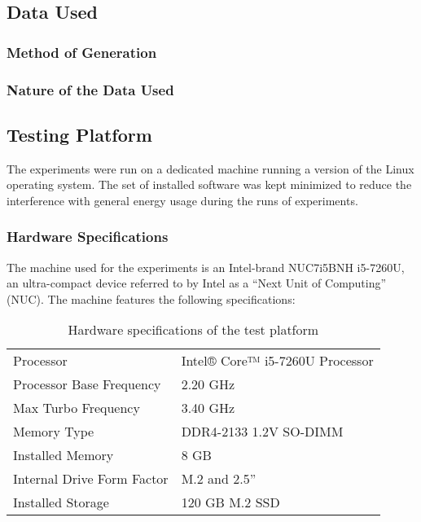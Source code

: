 \subsection{Data Used}

\subsubsection{Method of Generation}

\subsubsection{Nature of the Data Used}

\subsection{Testing Platform}

The experiments were run on a dedicated machine running a version of the Linux operating system. The set of installed software was kept minimized to reduce the interference with general energy usage during the runs of experiments.

\subsubsection{Hardware Specifications}

The machine used for the experiments is an Intel-brand NUC7i5BNH i5-7260U, an ultra-compact device referred to by Intel as a ``Next Unit of Computing'' (NUC). The machine features the following specifications:

\begin{table}[h!]
\begin{center}
\begin{tabular}{|ll|}
\hline
Processor & Intel® Core™ i5-7260U Processor\\
Processor Base Frequency & 2.20 GHz\\
Max Turbo Frequency & 3.40 GHz\\
Memory Type & DDR4-2133 1.2V SO-DIMM\\
Installed Memory & 8 GB\\
Internal Drive Form Factor & M.2 and 2.5''\\
Installed Storage & 120 GB M.2 SSD\\
\hline
\end{tabular}
\caption{Hardware specifications of the test platform}
\end{center}
\label{table:hardware_specs}
\end{table}

